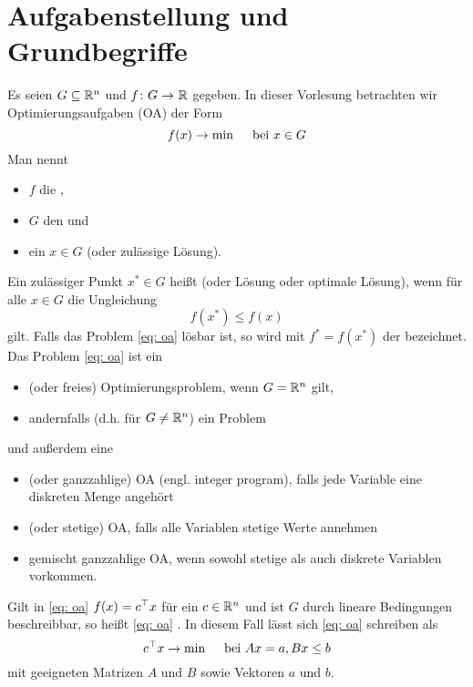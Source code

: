 \section{Aufgabenstellung und Grundbegriffe}

Es seien $G \subseteq \mathbb{R}^n$ und $\abb{f}{G}{\R}$ gegeben. In dieser Vorlesung betrachten wir Optimierungsaufgaben (OA) der Form
\begin{equation}\label{eq: oa}
	f(x) \to \min \quad \text{ bei } x \in G
\end{equation}
Man nennt
\begin{itemize}[nolistsep, topsep=-\parskip]
	\item $f$ die ,
	\item $G$ den  und
	\item ein $x \in  G$  (oder zulässige Lösung).
\end{itemize}
Ein zulässiger Punkt $x^\ast \in G$ heißt  (oder Lösung oder optimale Lösung), wenn für alle $x \in G$ die Ungleichung
\begin{equation}
	f(x^\ast) \le f(x)
\end{equation}
gilt. Falls das Problem \eqref{eq: oa} lösbar ist, so wird mit $f^\ast = f(x^\ast)$ der  bezeichnet. Das Problem \eqref{eq: oa} ist ein
\begin{itemize}[nolistsep, topsep=-\parskip]
	\item {} (oder freies) Optimierungsproblem, wenn $G = \mathbb{R}^n$ gilt,
	\item andernfalls (d.h. für $G \neq \mathbb{R}^n$) ein  Problem
\end{itemize}
und außerdem eine
\begin{itemize}[nolistsep, topsep=-\parskip]
	\item {} (oder ganzzahlige) OA (engl. integer program), falls jede Variable eine diskreten Menge angehört
	\item {} (oder stetige) OA, falls alle Variablen stetige Werte annehmen
	\item gemischt ganzzahlige OA, wenn sowohl stetige als auch diskrete Variablen vorkommen.
\end{itemize}

Gilt in \eqref{eq: oa} $f(x) = c^{\top} x$ für ein $c \in \mathbb{R}^n$ und ist $G$ durch lineare Bedingungen beschreibbar, so heißt \eqref{eq: oa} . In diesem Fall lässt sich \eqref{eq: oa} schreiben als
\begin{equation}
	c^{\top} x \to \min \quad \text{ bei } Ax = a, Bx \le b
\end{equation}
mit geeigneten Matrizen $A$ und $B$ sowie Vektoren $a$ und $b$.

